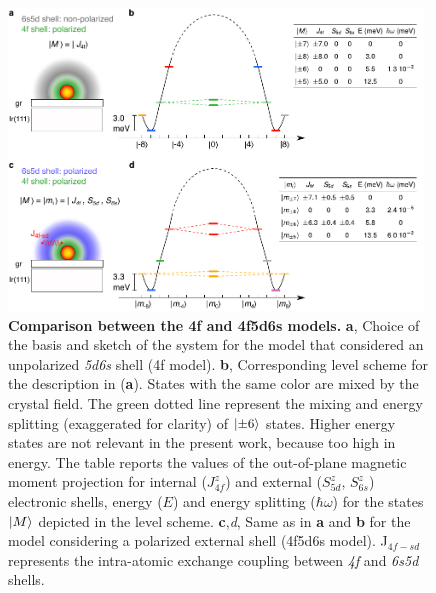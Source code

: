 \documentclass[
reprint,amsmath,amssymb,aps]{revtex4-2}
\begin{document}
\begin{figure}[ht!]
\includegraphics[width=0.98\textwidth]{Fig1_new.pdf}
\caption{\textbf{Comparison between the 4f and 4f5d6s models.} \textbf{a}, Choice of the basis and sketch of the system for the model that considered an unpolarized \textit{5d6s} shell (4f model). \textbf{b}, Corresponding level scheme for the description in (\textbf{a}). States with the same color are mixed by the crystal field. The green dotted line represent the mixing and energy splitting (exaggerated for clarity) of $\ket{\pm6}$ states. Higher energy states are not relevant in the present work, because too high in energy.  The table reports the values of the out-of-plane magnetic moment projection for internal ($J_{4f}^z$) and external ($S^z_{5d}$, $S^z_{6s}$)  electronic shells, energy ($E$) and energy splitting ($\hbar\omega$) for the states $\ket{M}$ depicted in the level scheme. \textbf{c},\textit{d}, Same as in \textbf{a} and \textbf{b} for the model considering a polarized external shell (4f5d6s model). J$_{4f-sd}$ represents the intra-atomic exchange coupling between \textit{4f} and \textit{6s5d} shells.
\label{fig:intra} }
\end{figure}
\end{document}
